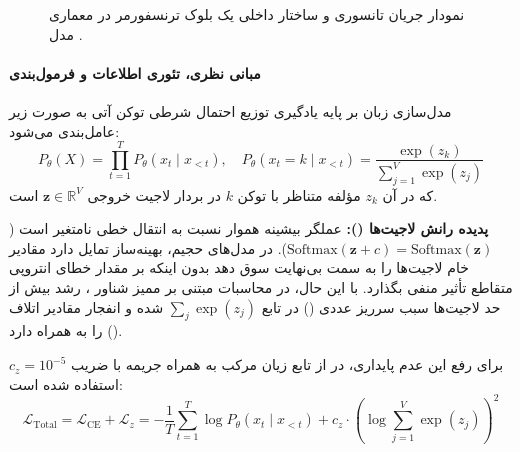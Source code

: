 \begin{figure}[htbp]
{%
}
\caption{نمودار جریان تانسوری و ساختار داخلی یک بلوک ترنسفورمر در معماری مدل .}
\label{fig:olmo_3_architecture}
\end{figure}

\paragraph*{مبانی نظری، تئوری اطلاعات و فرمول‌بندی }
مدل‌سازی زبان بر پایه یادگیری توزیع احتمال شرطی توکن آتی به صورت زیر عامل‌بندی می‌شود:
\begin{equation}
    P_\theta(X) = \prod_{t=1}^T P_\theta(x_t \mid x_{<t}), \quad P_\theta(x_t = k \mid x_{<t}) = \frac{\exp(z_k)}{\sum_{j=1}^V \exp(z_j)}
\end{equation}
که در آن $z_k$ مؤلفه متناظر با توکن $k$ در بردار لاجیت خروجی $\mathbf{z} \in \mathbb{R}^V$ است.

\textbf{پدیده رانش لاجیت‌ها ():} عملگر بیشینه هموار نسبت به انتقال خطی نامتغیر است ($\text{Softmax}(\mathbf{z} + c) = \text{Softmax}(\mathbf{z})$). در مدل‌های حجیم، بهینه‌ساز تمایل دارد مقادیر خام لاجیت‌ها را به سمت بی‌نهایت سوق دهد بدون اینکه بر مقدار خطای انتروپی متقاطع تأثیر منفی بگذارد. با این حال، در محاسبات مبتنی بر ممیز شناور ، رشد بیش از حد لاجیت‌ها سبب سرریز عددی () در تابع $\sum_{j} \exp(z_j)$ شده و انفجار مقادیر اتلاف () را به همراه دارد.

برای رفع این عدم پایداری، در  از تابع زیان مرکب به همراه جریمه  با ضریب $c_z = 10^{-5}$ استفاده شده است:
\begin{equation}
    \mathcal{L}_{\text{Total}} = \mathcal{L}_{\text{CE}} + \mathcal{L}_z = -\frac{1}{T} \sum_{t=1}^T \log P_\theta(x_t \mid x_{<t}) + c_z \cdot \left( \log \sum_{j=1}^V \exp(z_j) \right)^2
\end{equation}


